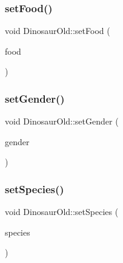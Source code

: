 \mbox{\label{classDinosaurOld_aba3d1b4310b1e3dce3b04060e5aad032}} 
\subsubsection{\texorpdfstring{set\+Food()}{setFood()}}
{\footnotesize\ttfamily void Dinosaur\+Old\+::set\+Food (\begin{DoxyParamCaption}\item[{const \hyperlink{DinosaurOld_8hpp_aeeb0837497c35a4ebbceb4e9386909f8}{Dinosaur\+Food}}]{food }\end{DoxyParamCaption})}

\mbox{\label{classDinosaurOld_aa9c1e394d304b2f778d5764af018e18e}} 
\subsubsection{\texorpdfstring{set\+Gender()}{setGender()}}
{\footnotesize\ttfamily void Dinosaur\+Old\+::set\+Gender (\begin{DoxyParamCaption}\item[{const \hyperlink{DinosaurOld_8hpp_a98f70ab69c44631b0efc003a2c9b3d30}{Dinosaur\+Gender}}]{gender }\end{DoxyParamCaption})}

\mbox{\label{classDinosaurOld_afc06be1c0593e50917b750eb9b92afa8}} 
\subsubsection{\texorpdfstring{set\+Species()}{setSpecies()}}
{\footnotesize\ttfamily void Dinosaur\+Old\+::set\+Species (\begin{DoxyParamCaption}\item[{const \hyperlink{DinosaurOld_8hpp_aef2140b5b57464fa283af86adcd6c5c1}{Dinosaur\+Species}}]{species }\end{DoxyParamCaption})}

\mbox{\label{classDinosaurOld_a4161301ad916d20df5d37b2c2d6a48a2}} 
